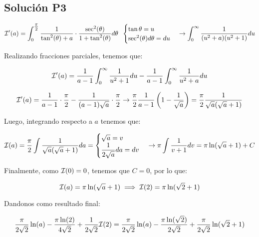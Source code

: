\begin{CajaTitulo}{\begin{center}\subsection{Solución P3}\end{center}}
    \[\I'(a) = \int_{0}^{\mathlarger{\frac{\pi}{2}}}\frac{1}{\tan^2(\theta) + a}\cdot\frac{\sec^2(\theta)}{1 + \tan^2(\theta)}d\theta \hspace{0.2cm}\cambio{\tan \theta = u} {\sec^2(\theta)d\theta = du} \rightarrow \int_{0}^{\infty} \frac{1}{(u^2 + a)(u^2 + 1)}du\]

    Realizando fracciones parciales, tenemos que:

    \[\mathcal{I}'(a) = \frac{1}{a-1}\int_{0}^{\infty}\frac{1}{u^2 +1}du - \frac{1}{a-1}\int_{0}^{\infty}\frac{1}{u^2 + a}du\]

    \[\mathcal{I}'(a) = \frac{1}{a-1}\cdot \frac{\pi}{2} - \frac{1}{(a-1)\sqrt{a}}\cdot\frac{\pi}{2} \rightarrow \frac{\pi}{2}\frac{1}{a-1}\left(1 - \frac{1}{\sqrt{a}}\right) = \frac{\pi}{2}\frac{1}{\sqrt{a}(\sqrt{a}+1)}\]

    Luego, integrando respecto a $a$ tenemos que:

    \[\I(a) = \frac{\pi}{2}\int\frac{1}{\sqrt{a}(\sqrt{a}+1)}da = \cambio{\sqrt{a} = v}{\mathlarger{\frac{1}{2\sqrt{a}}}da = dv} \rightarrow \pi\int\frac{1}{v+1}dv = \pi\ln(\sqrt{a}+1) + C\]

    Finalmente, como $\mathcal{I}(0) = 0$, tenemos que $C = 0$, por lo que:

    \[\mathcal{I}(a) = \pi\ln(\sqrt{a}+1) \implies \mathcal{I}(2) = \pi \ln(\sqrt{2} +1)\]

    Dandonos como resultado final:

    \[\frac{\pi}{2\sqrt{2}}\ln(a) - \frac{\pi\ln(2)}{4\sqrt{2}} + \frac{1}{2\sqrt{2}}\mathcal{I}(2) = \frac{\pi}{2\sqrt{2}}\ln(a) - \frac{\pi\ln(\sqrt{2})}{2\sqrt{2}} + \frac{\pi}{2\sqrt{2}}\ln(\sqrt{2} +1)\]

    \vspace{3cm}
\end{CajaTitulo}